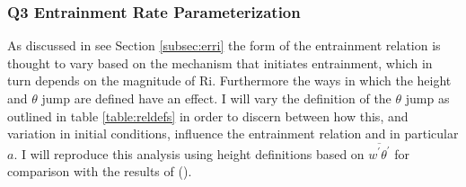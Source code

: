 \subsubsection{Q3 Entrainment Rate Parameterization}
As discussed in see Section \ref{subsec:erri} the form of the entrainment relation is thought to vary based on the mechanism that initiates entrainment, which in turn depends on the magnitude of \acs{Ri}.  Furthermore the ways in which the height and $\theta$ jump are defined have an effect. I will vary the definition of the $\theta$ jump as outlined in table \ref{table:reldefs} in order to discern between how this, and variation in initial conditions, influence the entrainment relation and in particular $a$. I will reproduce this analysis using height definitions based on $\overline{w^{'}\theta^{'}}$ for comparison with the results of \citeauthor{FedConzMir04} (\citeyear{FedConzMir04}).

\endinput

Any text after an \endinput is ignored.
You could put scraps here or things in progress.



